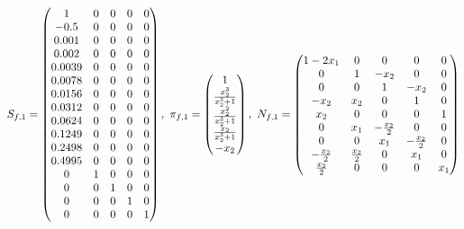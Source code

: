 \documentclass[fleqn]{article}
\begin{document}
$
S_{f,1} = \pmqty{ 1 & 0 & 0 & 0 & 0 \\ -0.5 & 0 & 0 & 0 & 0 \\ 0.001 & 0 & 0 & 0 & 0 \\ 0.002 & 0 & 0 & 0 & 0 \\ 0.0039 & 0 & 0 & 0 & 0 \\ 0.0078 & 0 & 0 & 0 & 0 \\ 0.0156 & 0 & 0 & 0 & 0 \\ 0.0312 & 0 & 0 & 0 & 0 \\ 0.0624 & 0 & 0 & 0 & 0 \\ 0.1249 & 0 & 0 & 0 & 0 \\ 0.2498 & 0 & 0 & 0 & 0 \\ 0.4995 & 0 & 0 & 0 & 0 \\ 0 & 1 & 0 & 0 & 0 \\ 0 & 0 & 1 & 0 & 0 \\ 0 & 0 & 0 & 1 & 0 \\ 0 & 0 & 0 & 0 & 1 },~
\pi_{f,1} = \pmqty{
    1                         \\
    \frac{x_{2}^3}{x_{2}^3+1} \\
    \frac{x_{2}^2}{x_{2}^3+1} \\
    \frac{x_{2}}{x_{2}^3+1}   \\
    -x_{2}                    \\
},~
N_{f,1} = \pmqty{
    1-2x_{1}         & 0               & 0                & 0                & 0     \\
    0                & 1               & -x_{2}           & 0                & 0     \\
    0                & 0               & 1                & -x_{2}           & 0     \\
    -x_{2}           & x_{2}           & 0                & 1                & 0     \\
    x_{2}            & 0               & 0                & 0                & 1     \\
    0                & x_{1}           & -\frac{x_{2}}{2} & 0                & 0     \\
    0                & 0               & x_{1}            & -\frac{x_{2}}{2} & 0     \\
    -\frac{x_{2}}{2} & \frac{x_{2}}{2} & 0                & x_{1}            & 0     \\
    \frac{x_{2}}{2}  & 0               & 0                & 0                & x_{1} \\
}$
\end{document}
